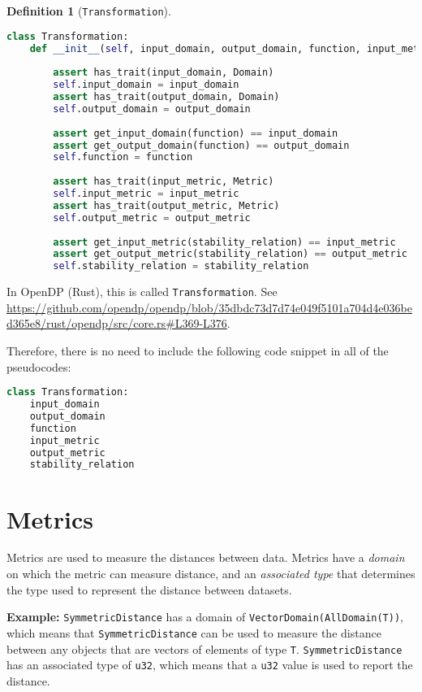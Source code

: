 \documentclass[11pt,a4paper]{article}
\theoremstyle{definition}
\newtheorem{definition}{Definition}[section]
\newcommand{\connor}[1]{{ {\color{teal}{(connor)~#1}}}}
\newcommand{\inOpenDPRust}[2]{In OpenDP (Rust), this is called \texttt{#1}. See \url{#2}.}
\begin{document}
\begin{definition}[\texttt{Transformation}]
\connor{Mike helped a lot with this definition, so I'm hopeful it's fully correct, or at least very close.}
\begin{lstlisting}[language=Python]
class Transformation:
    def __init__(self, input_domain, output_domain, function, input_metric, output_metric, stability_relation):
    	
        assert has_trait(input_domain, Domain)
        self.input_domain = input_domain
        assert has_trait(output_domain, Domain)
        self.output_domain = output_domain
        
        assert get_input_domain(function) == input_domain
        assert get_output_domain(function) == output_domain
        self.function = function
        
        assert has_trait(input_metric, Metric)
        self.input_metric = input_metric
        assert has_trait(output_metric, Metric)
        self.output_metric = output_metric
        
        assert get_input_metric(stability_relation) == input_metric
        assert get_output_metric(stability_relation) == output_metric
        self.stability_relation = stability_relation
\end{lstlisting}
    
    \inOpenDPRust{Transformation}{https://github.com/opendp/opendp/blob/35dbdc73d7d74e049f5101a704d4e036bed365e8/rust/opendp/src/core.rs\#L369-L376}
\end{definition}

Therefore, there is no need to include the following code snippet in all of the pseudocodes:
\begin{lstlisting}[language=Python]
class Transformation:
    input_domain
    output_domain
    function
    input_metric
    output_metric
    stability_relation 
\end{lstlisting}

\section{Metrics}

Metrics are used to measure the distances between data. Metrics have a \emph{domain} on which the metric can measure distance, and an \emph{associated type} that determines the type used to represent the distance between datasets.

\textbf{Example:} \texttt{SymmetricDistance} has a domain of \texttt{VectorDomain(AllDomain(T))}, which means that \texttt{SymmetricDistance} can be used to measure the distance between any objects that are vectors of elements of type \texttt{T}. \texttt{SymmetricDistance} has an associated type of \texttt{u32}, which means that a \texttt{u32} value is used to report the distance.
\end{document}
